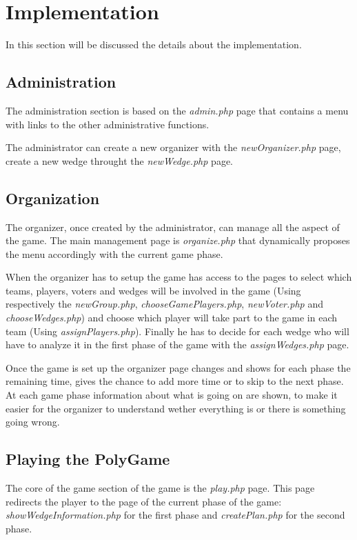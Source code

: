 \section{Implementation}
In this section will be discussed the details about the implementation.

\subsection{Administration}
The administration section is based on the \emph{admin.php} page that contains a menu with links to the other administrative functions.

The administrator can create a new organizer with the \emph{newOrganizer.php} page, create a new wedge throught the \emph{newWedge.php} page.

\subsection{Organization}
The organizer, once created by the administrator, can manage all the aspect of the game. The main management page is \emph{organize.php} that dynamically proposes the menu accordingly with the current game phase.

When the organizer has to setup the game has access to the pages to select which teams, players, voters and wedges will be involved in the game (Using respectively the \emph{newGroup.php}, \emph{chooseGamePlayers.php}, \emph{newVoter.php} and \emph{chooseWedges.php}) and choose which player will take part to the game in each team (Using \emph{assignPlayers.php}).
Finally he has to decide for each wedge who will have to analyze it in the first phase of the game with the \emph{assignWedges.php} page.

Once the game is set up the organizer page changes and shows for each phase the remaining time, gives the chance to add more time or to skip to the next phase. At each game phase information about what is going on are shown, to make it easier for the organizer to understand wether everything is or there is something going wrong.

\subsection{Playing the PolyGame}
The core of the game section of the game is the \emph{play.php} page. This page redirects the player to the page of the current phase of the game: \emph{showWedgeInformation.php} for the first phase and \emph{createPlan.php} for the second phase.

